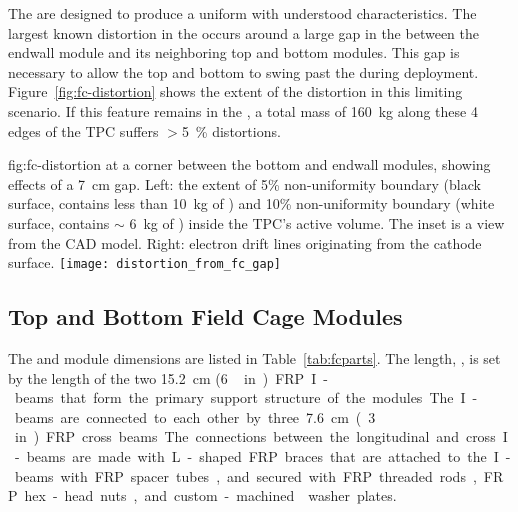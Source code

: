 The  are designed to produce a uniform \efield with understood characteristics.
The largest known \efield distortion in the  occurs around a large gap in the  between the endwall module and its neighboring top and bottom modules. This gap is necessary to allow the top and bottom to swing past the  during deployment.  Figure~\ref{fig:fc-distortion} shows the extent of the distortion in this limiting scenario. 
If this feature remains in the , a total \lar mass of \SI{160}{kg} along these 4 edges of the TPC suffers $>$\SI{5}{\%} \efield distortions.

\begin{dunefigure}
{fig:fc-distortion}
{\efield at a corner between the bottom and endwall  modules, showing effects of a \SI{7}{cm} gap. Left: the extent of \num{5}\% \efield{} non-uniformity boundary (black surface, contains less than \SI{10}{kg} of \lar) and \num{10}\% non-uniformity boundary (white surface, contains $\sim$ \SI{6}{kg} of \lar) inside the TPC's active volume. The inset is a view from the CAD model.  Right: electron drift lines originating from the cathode surface.}
\texttt{[image: distortion\_from\_fc\_gap]}
\end{dunefigure}



\subsection{Top and Bottom Field Cage Modules}

The  and  module dimensions are listed in Table~\ref{tab:fcparts}. The length, \spfcmodlen{}, is set by the length of the two \SI{15.2}{\cm} (\SI{6}\,in) FRP I-beams that form the primary support structure of the modules. The I-beams are connected to each other by three  \SI{7.6}{\cm} (\SI{3}\,in) FRP cross beams. The connections between the longitudinal and cross I-beams are made with L-shaped FRP braces that are attached to the I-beams with FRP spacer tubes, and secured with FRP threaded rods, FRP hex-head nuts, and custom-machined \frfour washer plates.

